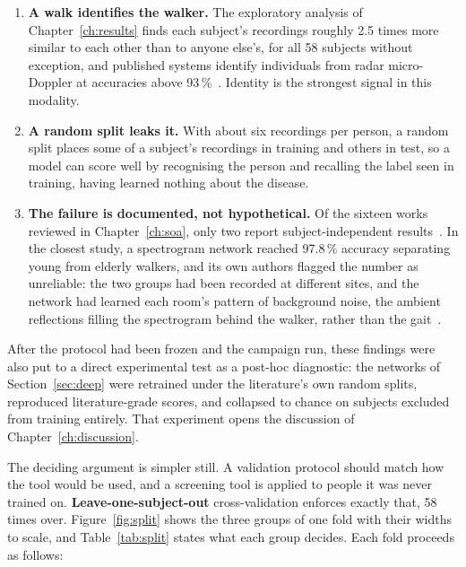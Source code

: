 \begin{enumerate}
  \item \textbf{A walk identifies the walker.} The exploratory analysis of
        Chapter~\ref{ch:results} finds each subject's recordings roughly 2.5 times more
        similar to each other than to anyone else's, for all 58 subjects
        without exception, and published systems identify individuals from
        radar micro-Doppler at accuracies above
        93\,\%~\cite{papanastasiou2020, ni2020}. Identity is the strongest
        signal in this modality.
  \item \textbf{A random split leaks it.} With about six recordings per
        person, a random split places some of a subject's recordings in
        training and others in test, so a model can score well by recognising
        the person and recalling the label seen in training, having learned
        nothing about the disease.
  \item \textbf{The failure is documented, not hypothetical.} Of the sixteen
        works reviewed in Chapter~\ref{ch:soa}, only two report subject-independent
        results~\cite{park2016, fard2026}. In the closest study, a
        spectrogram network reached 97.8\,\% accuracy separating young from
        elderly walkers, and its own authors flagged the number as
        unreliable: the two groups had been recorded at different sites, and
        the network had learned each room's pattern of background noise, the
        ambient reflections filling the spectrogram behind the walker, rather
        than the gait~\cite{hayashi2021}.
\end{enumerate}

After the protocol had been frozen and the campaign run, these findings were
also put to a direct experimental test as a post-hoc diagnostic: the networks
of Section~\ref{sec:deep} were retrained under the literature's own random
splits, reproduced literature-grade scores, and collapsed to chance on
subjects excluded from training entirely. That experiment opens the
discussion of Chapter~\ref{ch:discussion}.

The deciding argument is simpler still. A validation protocol should match
how the tool would be used, and a screening tool is applied to people it was
never trained on. \textbf{Leave-one-subject-out} cross-validation enforces
exactly that, 58 times over. Figure~\ref{fig:split} shows the three groups of
one fold with their widths to scale, and Table~\ref{tab:split} states what
each group decides. Each fold proceeds as follows:

